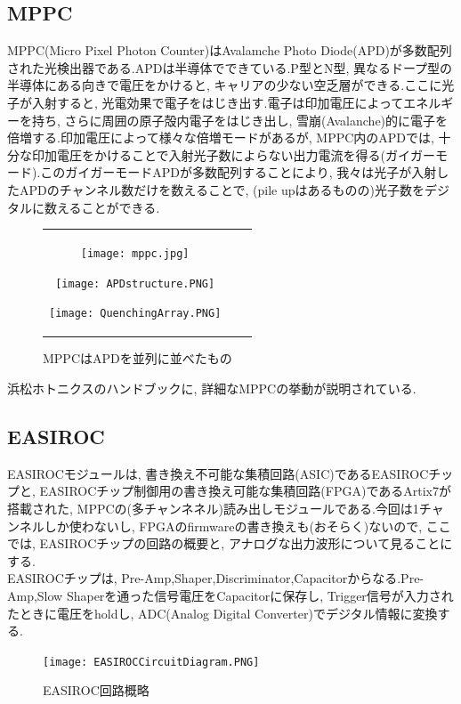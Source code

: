 \subsection{MPPC}
MPPC(Micro Pixel Photon Counter)はAvalamche Photo Diode(APD)が多数配列された光検出器である.APDは半導体でできている.P型とN型, 異なるドープ型の半導体にある向きで電圧をかけると, キャリアの少ない空乏層ができる.ここに光子が入射すると, 光電効果で電子をはじき出す.電子は印加電圧によってエネルギーを持ち, さらに周囲の原子殻内電子をはじき出し, 雪崩(Avalanche)的に電子を倍増する.印加電圧によって様々な倍増モードがあるが, MPPC内のAPDでは, 十分な印加電圧をかけることで入射光子数によらない出力電流を得る(ガイガーモード).このガイガーモードAPDが多数配列することにより, 我々は光子が入射したAPDのチャンネル数だけを数えることで, (pile upはあるものの)光子数をデジタルに数えることができる.
\begin{figure}[h]
  \begin{tabular}{ccc}
    \begin{minipage}[t]{0.33\hsize}
      \begin{center}
        \texttt{[image: mppc.jpg]}
      \end{center}
      \caption{MPPC}
    \end{minipage}
    \begin{minipage}[t]{0.33\hsize}
      \begin{center}
        \texttt{[image: APDstructure.PNG]}
      \end{center}
      \caption{APD}
    \end{minipage}
    \begin{minipage}[t]{0.33\hsize}
      \begin{center}
        \texttt{[image: QuenchingArray.PNG]}
      \end{center}
      \caption{MPPCはAPDを並列に並べたもの}
    \end{minipage}
  \end{tabular}
\end{figure}
浜松ホトニクスのハンドブックに, 詳細なMPPCの挙動が説明されている.\cite{hamamatsu}
\subsection{EASIROC}
EASIROCモジュールは, 書き換え不可能な集積回路(ASIC)であるEASIROCチップと, EASIROCチップ制御用の書き換え可能な集積回路(FPGA)であるArtix7が搭載された, MPPCの(多チャンネネル)読み出しモジュールである.今回は1チャンネルしか使わないし, FPGAのfirmwareの書き換えも(おそらく)ないので, ここでは, EASIROCチップの回路の概要と, アナログな出力波形について見ることにする.\\
EASIROCチップは, Pre-Amp,Shaper,Discriminator,Capacitorからなる.Pre-Amp,Slow Shaperを通った信号電圧をCapacitorに保存し, Trigger信号が入力されたときに電圧をholdし, ADC(Analog Digital Converter)でデジタル情報に変換する.
\begin{figure}[H]
  \begin{center}
    \texttt{[image: EASIROCCircuitDiagram.PNG]}
  \end{center}
  \caption{EASIROC回路概略}
\end{figure}

